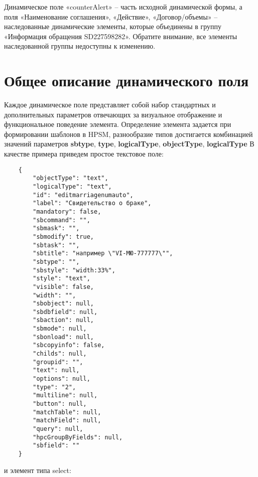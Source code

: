 \documentclass[../index.tex]{subfiles}
\begin{document}
Динамическое поле «counterAlert» – часть исходной динамической формы,
а поля «Наименование соглашения», «Действие», «Договор/объемы» – наследованные динамические элементы,
которые объединены в группу «Информация обращения SD227598282».
Обратите внимание, все элементы наследованной группы недоступны к изменению.


\section{Общее описание динамического поля}
    Каждое динамическое поле представляет собой набор стандартных и дополнительных параметров отвечающих за визуальное отображение и функциональное поведение элемента.
    Определение элемента задается при формировании шаблонов в HPSM, разнообразие типов достигается комбинацией значений параметров \textbf{sbtype}, \textbf{type}, \textbf{logicalType}, \textbf{objectType}, \textbf{logicalType}
    В качестве примера приведем простое текстовое поле:
\begin{verbatim}
    {
        "objectType": "text",
        "logicalType": "text",
        "id": "editmarriagenumauto",
        "label": "Свидетельство о браке",
        "mandatory": false,
        "sbcommand": "",
        "sbmask": "",
        "sbmodify": true,
        "sbtask": "",
        "sbtitle": "например \"VI-МЮ-777777\"",
        "sbtype": "",
        "sbstyle": "width:33%",
        "style": "text",
        "visible": false,
        "width": "",
        "sbobject": null,
        "sbdbfield": null,
        "sbaction": null,
        "sbmode": null,
        "sbonload": null,
        "sbcopyinfo": false,
        "childs": null,
        "groupid": "",
        "text": null,
        "options": null,
        "type": "2",
        "multiline": null,
        "button": null,
        "matchTable": null,
        "matchField": null,
        "query": null,
        "hpcGroupByFields": null,
        "sbfield": ""
    }
\end{verbatim}
    и элемент типа select:
\end{document}
